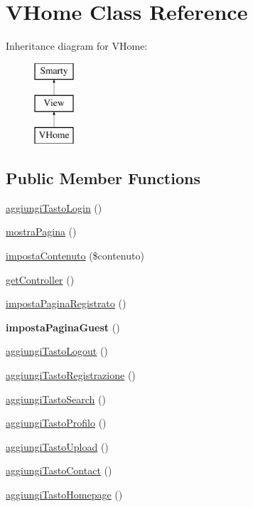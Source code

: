 \hypertarget{class_v_home}{}\section{V\+Home Class Reference}
\label{class_v_home}
Inheritance diagram for V\+Home\+:\begin{figure}[H]
\begin{center}
\leavevmode
\includegraphics[height=3.000000cm]{class_v_home}
\end{center}
\end{figure}
\subsection*{Public Member Functions}
\begin{DoxyCompactItemize}
\item 
\mbox{\hyperlink{class_v_home_a3e06682fe6e21b37b754eeae97125508}{aggiungi\+Tasto\+Login}} ()
\item 
\mbox{\hyperlink{class_v_home_a72414d19f9cddd5682f160cb9b31344c}{mostra\+Pagina}} ()
\item 
\mbox{\hyperlink{class_v_home_a56c889c43b21fb05449872dfcd614a85}{imposta\+Contenuto}} (\$contenuto)
\item 
\mbox{\hyperlink{class_v_home_a6997728b15232ea9c0ed4c142634bcf8}{get\+Controller}} ()
\item 
\mbox{\hyperlink{class_v_home_ace9a51c09e9346c6e508d5f67c8ba6d0}{imposta\+Pagina\+Registrato}} ()
\item 
\mbox{\label{class_v_home_a8c9dfca5dd4c71702668e5d4f2a44d03}} 
{\bfseries imposta\+Pagina\+Guest} ()
\item 
\mbox{\hyperlink{class_v_home_a4623e9c0d8aef960ba5bb9c61bfe97da}{aggiungi\+Tasto\+Logout}} ()
\item 
\mbox{\hyperlink{class_v_home_a05532f14a1f2d0d974c1dc10d7a20754}{aggiungi\+Tasto\+Registrazione}} ()
\item 
\mbox{\hyperlink{class_v_home_a4ca8c85ed6df3d7b40594e257b5cd50c}{aggiungi\+Tasto\+Search}} ()
\item 
\mbox{\hyperlink{class_v_home_afe8dd3a6b2fc94f88bc08424f35c678e}{aggiungi\+Tasto\+Profilo}} ()
\item 
\mbox{\hyperlink{class_v_home_a94c49a2241c8767f71eb0e20a2ab9c4b}{aggiungi\+Tasto\+Upload}} ()
\item 
\mbox{\hyperlink{class_v_home_ac9fd5bec876ca9999718b2d2ba140d21}{aggiungi\+Tasto\+Contact}} ()
\item 
\mbox{\hyperlink{class_v_home_a3a1dff61eae360811ce56990ab8de7ea}{aggiungi\+Tasto\+Homepage}} ()
\end{DoxyCompactItemize}
